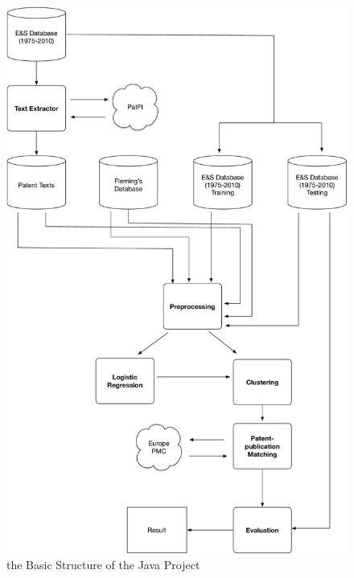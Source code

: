 \begin{figure}
\centering
\includegraphics[scale=0.5]{codeUML.pdf}
\caption{the Basic Structure of the Java Project}
\end{figure}


